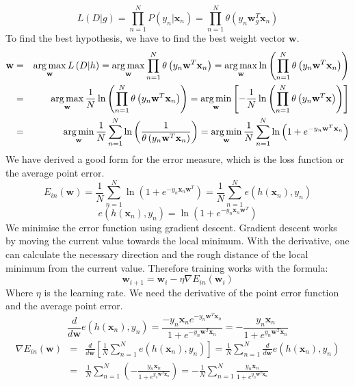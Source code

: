 \[L(D|g) = \prod_{n=1}^N P(y_n | \mathbf{x}_n) = \prod_{n=1}^N \theta(y_n \mathbf{w}_g^T \mathbf{x}_n)\]
To find the best hypothesis, we have to find the best weight vector $\mathbf{w}$.
\begin{eqnarray*}
\mathbf{w} & = & \operatorname*{arg\,max}_\mathbf{w} L \left( D|h \right) = \operatorname*{arg\,max}_\mathbf{w} \prod_{n=1}^N  \theta \left( y_n \mathbf{w}^T \mathbf{x}_n \right) = \operatorname*{arg\,max}_\mathbf{w} \ln \left( \prod_{n=1}^N \theta\left( y_n \mathbf{w}^T \mathbf{x}_n \right) \right) \\
& = & \operatorname*{arg\,max}_\mathbf{w} \frac{1}{N} \ln \left( \prod_{n=1}^N \theta \left( y_n \mathbf{w}^T \mathbf{x}_n \right) \right) = \operatorname*{arg\,min}_\mathbf{w} \left[ - \frac{1}{N} \ln \left( \prod_{n=1}^N \theta \left( y_n \mathbf{w}^T \mathbf{x} \right) \right) \right] \\
& = & \operatorname*{arg\,min}_\mathbf{w} \frac{1}{N} \sum_{n=1}^N \ln \left( \frac{1}{\theta \left( y_n \mathbf{w}^T \mathbf{x}_n \right)} \right) = \operatorname*{arg\,min}_\mathbf{w} \frac{1}{N} \sum_{n=1}^N \ln \left( 1 + e^{-y_n \mathbf{w}^T \mathbf{x}_n} \right)
\end{eqnarray*}
We have derived a good form for the error measure, which is the loss function or the average point error.
\[ E_{in} \left( \mathbf{w} \right) = \frac{1}{N} \sum_{n=1}^N \ln \left( 1 + e^{-y_n \mathbf{x}_n \mathbf{w}^T} \right) = \frac{1}{N} \sum_{n=1}^N e \left( h \left( \mathbf{x}_n \right), y_n \right) \]
\[ e \left( h \left( \mathbf{x}_n \right), y_n \right) = \ln \left( 1 + e^{-y_n \mathbf{x}_n \mathbf{w}^T} \right) \]
We minimise the error function using gradient descent. Gradient descent works by moving the current value towards the local minimum. With the derivative, one can calculate the necessary direction and the rough distance of the local minimum from the current value. Therefore training works with the formula:
\[ \mathbf{w}_{i+1} = \mathbf{w}_i - \eta \nabla E_{in} \left( \mathbf{w}_i \right) \]
Where $\eta$ is the learning rate. We need the derivative of the point error function and the average point error.
\[ \frac{d}{d \mathbf{w}} e \left( h \left( \mathbf{x}_n \right), y_n \right) = \frac{-y_n \mathbf{x}_n e^{-y_n \mathbf{w}^T \mathbf{x}_n}}{1 + e^{-y_n \mathbf{w}^T \mathbf{x}_n}} = -\frac{y_n \mathbf{x}_n}{1 + e^{y_n \mathbf{w}^T \mathbf{x}_n}} \]
\begin{eqnarray*}
\nabla E_{in} \left( \mathbf{w} \right) & = & \frac{d}{d \mathbf{w}} \left[ \frac{1}{N} \sum_{n=1}^N e \left( h \left( \mathbf{x}_n \right), y_n \right) \right] = \frac{1}{N} \sum_{n=1}^N \frac{d}{d \mathbf{w}} e \left( h \left( \mathbf{x}_n \right), y_n \right) \\
& = & \frac{1}{N} \sum_{n=1}^N \left( -\frac{y_n \mathbf{x}_n}{1 + e^{y_n \mathbf{w}^T \mathbf{x}_n}} \right) = - \frac{1}{N} \sum_{n=1}^N \frac{y_n \mathbf{x}_n}{1 + e^{y_n \mathbf{w}^T \mathbf{x}_n}}
\end{eqnarray*}
